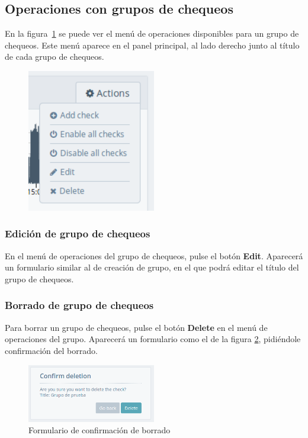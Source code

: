 \subsection{Operaciones con grupos de chequeos}

En la figura~\ref{fig:operaciones-grupo} se puede ver el menú de operaciones
disponibles para un grupo de chequeos. Este menú aparece en el panel principal,
al lado derecho junto al título de cada grupo de chequeos.

\begin{figure}[hbtp]
  \centering
  \includegraphics[width=0.5\textwidth]{apendice_manual_usuario/grupo_submenu_acciones.png}
  \caption{}
  \label{fig:operaciones-grupo}
\end{figure}

\subsubsection{Edición de grupo de chequeos}

En el menú de operaciones del grupo de chequeos, pulse el botón
\textbf{Edit}. Aparecerá un formulario similar al de creación de grupo, en el
que podrá editar el título del grupo de chequeos.

\subsubsection{Borrado de grupo de chequeos}

Para borrar un grupo de chequeos, pulse el botón \textbf{Delete} en el menú de
operaciones del grupo. Aparecerá un formulario como el de la figura
\ref{fig:formulario-borrado-grupo}, pidiéndole confirmación del borrado. 

\begin{figure}[hbtp]
  \centering
  \includegraphics[width=0.5\textwidth]{apendice_manual_usuario/formulario_borrado_grupo}
  \caption{Formulario de confirmación de borrado}
  \label{fig:formulario-borrado-grupo}
\end{figure}

